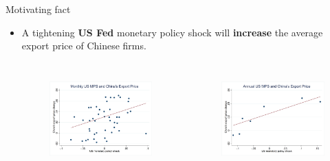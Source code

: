 \documentclass[10pt]{beamer}
\begin{document}
\begin{frame}{Motivating fact}
    \begin{itemize}
        \item A tightening \textbf{US Fed} monetary policy shock will \textbf{increase} the average export price of Chinese firms.
        \begin{columns}
    	\begin{figure}[htbp]
                \centering
                \includegraphics[width=1.1\columnwidth]{latex/slides/pic_Nov2023/brw_monthly.png}
                \label{fig.US_shock}
    	\end{figure}
    	\begin{figure}[htbp]
                \centering
                \includegraphics[width=1.1\columnwidth]{latex/slides/pic_Nov2023/brw_annual.png}
                \label{fig.EU_shock}
    	\end{figure}
        \end{columns}
    \end{itemize}
\end{frame}
\end{document}
